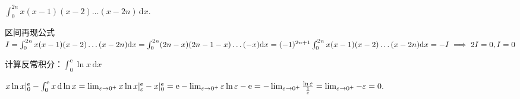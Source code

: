 \begin{examp}{$\displaystyle \int_{0}^{2n} x(x-1)(x-2)\dots (x-2n) \,\mathrm{d}x .$}
    \par \jie 区间再现公式$I=\int_{0}^{2n}x(x-1)(x-2)\dots (x-2n)\mathrm{d}x=\int_{0}^{2n}(2n-x)(2n-1-x)\dots (-x)\mathrm{d}x=(-1)^{2n+1}\int_{0}^{2n}x(x-1)(x-2)\dots (x-2n)\mathrm{d}x=-I\\
    \implies 2I=0,I=0$
\end{examp}

\begin{examp}{计算反常积分：$\displaystyle \int_{0}^{\mathrm{e}} \ln x \,\mathrm{d}x $}
    \par \jie $x\ln x \vert^\mathrm{e}_0-\int_{0}^{\mathrm{e}} x \,\mathrm{d}\ln x =\lim_{\varepsilon \to 0^+}x\ln x\vert ^\mathrm{e}_\varepsilon -x\vert^\mathrm{e}_0=\mathrm{e}-\lim_{\varepsilon \to 0^+}\varepsilon\ln \varepsilon-\mathrm{e}\\
    =-\lim_{\varepsilon \to 0^+}\frac{\ln \varepsilon}{\frac{1}{\varepsilon}}=\lim_{\varepsilon \to 0^+}-\varepsilon=0.$
\end{examp}
